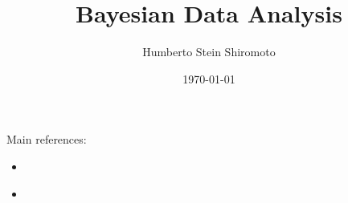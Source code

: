 \documentclass[sfsidenotes,notoc,nobib,a4paper]{tufte-book}
\title{Bayesian Data Analysis}
\author{Humberto Stein Shiromoto}
\date{\today}
\begin{document}
\setcounter{tocdepth}{1}
\maketitle




\tableofcontents
\adjustmtc
\printnomenclature

\newpage
Main references:
\begin{itemize}
    \item \citep{Martin:2018aa}
    \item \citep{Gelman13}
\end{itemize}











\appendix
%



\printbibliography[heading=bibintoc]
\printindex
\end{document}
